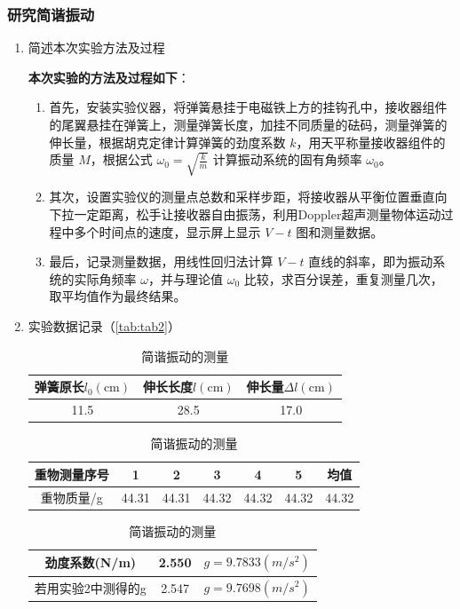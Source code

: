 \documentclass[dvipsnames, svgnames,a4paper,11pt]{article}
\begin{document}
	\subsubsection{研究简谐振动}
	\begin{enumerate}
		\item 简述本次实验方法及过程
		
		\textbf{本次实验的方法及过程如下}：
		
		\begin{enumerate}
			\item 首先，安装实验仪器，将弹簧悬挂于电磁铁上方的挂钩孔中，接收器组件的尾翼悬挂在弹簧上，测量弹簧长度，加挂不同质量的砝码，测量弹簧的伸长量，根据胡克定律计算弹簧的劲度系数 \( k \)，用天平称量接收器组件的质量 \( M \)，根据公式 \( \omega_0 = \sqrt{\frac{k}{m}} \) 计算振动系统的固有角频率 \( \omega_0 \)。
			
			\item 其次，设置实验仪的测量点总数和采样步距，将接收器从平衡位置垂直向下拉一定距离，松手让接收器自由振荡，利用Doppler超声测量物体运动过程中多个时间点的速度，显示屏上显示 \( V-t \) 图和测量数据。
			
			\item 最后，记录测量数据，用线性回归法计算 \( V-t \) 直线的斜率，即为振动系统的实际角频率 \( \omega \)，并与理论值 \( \omega_0 \) 比较，求百分误差，重复测量几次，取平均值作为最终结果。
		\end{enumerate}		
		
		\clearpage
		\item 实验数据记录（\cref{tab:tab2}）
		
		\begin{table}[h]
			\centering
			\caption{简谐振动的测量}
			\label{tab:tab3}
			\begin{tabular}{|c|c|c|}
				\hline
				弹簧原长$l_0 (\text{cm})$ & 伸长长度$l (\text{cm})$ & 伸长量$\Delta l (\text{cm})$ \\
				\hline
				11.5 & 28.5 & 17.0 \\
				\hline
			\end{tabular}
			
			\begin{tabular}{|c|c|c|c|c|c|c|}
				\hline
				重物测量序号 & 1 & 2 & 3 & 4 & 5 & 均值 \\
				\hline
				重物质量/g & 44.31 & 44.31 & 44.32 & 44.32 & 44.32 & 44.32 \\
				\hline
			\end{tabular}
			
			\begin{tabular}{|c|c|c|}
				\hline
				劲度系数(N/m) & 2.550 & $g=9.7833(m/s^2)$  \\
				\hline
				若用实验2中测得的g & 2.547 & $g=9.7698(m/s^2)$ \\
				\hline
			\end{tabular}
			

\end{table}
\end{enumerate}
\end{document}

